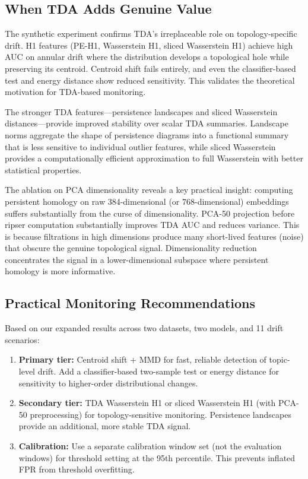 \subsection{When TDA Adds Genuine Value}

The synthetic experiment confirms TDA's irreplaceable role on topology-specific drift. H1 features (PE-H1, Wasserstein H1, sliced Wasserstein H1) achieve high AUC on annular drift where the distribution develops a topological hole while preserving its centroid. Centroid shift fails entirely, and even the classifier-based test and energy distance show reduced sensitivity. This validates the theoretical motivation for TDA-based monitoring.

The stronger TDA features---persistence landscapes and sliced Wasserstein distances---provide improved stability over scalar TDA summaries. Landscape norms aggregate the shape of persistence diagrams into a functional summary that is less sensitive to individual outlier features, while sliced Wasserstein provides a computationally efficient approximation to full Wasserstein with better statistical properties.

The ablation on PCA dimensionality reveals a key practical insight: computing persistent homology on raw 384-dimensional (or 768-dimensional) embeddings suffers substantially from the curse of dimensionality. PCA-50 projection before ripser computation substantially improves TDA AUC and reduces variance. This is because \vrfilt filtrations in high dimensions produce many short-lived features (noise) that obscure the genuine topological signal. Dimensionality reduction concentrates the signal in a lower-dimensional subspace where persistent homology is more informative.

\subsection{Practical Monitoring Recommendations}

Based on our expanded results across two datasets, two models, and 11 drift scenarios:

\begin{enumerate}[leftmargin=*,itemsep=2pt,topsep=2pt]
    \item \textbf{Primary tier:} Centroid shift + MMD for fast, reliable detection of topic-level drift. Add a classifier-based two-sample test or energy distance for sensitivity to higher-order distributional changes.
    \item \textbf{Secondary tier:} TDA Wasserstein H1 or sliced Wasserstein H1 (with PCA-50 preprocessing) for topology-sensitive monitoring. Persistence landscapes provide an additional, more stable TDA signal.
    \item \textbf{Calibration:} Use a separate calibration window set (not the evaluation windows) for threshold setting at the 95th percentile. This prevents inflated FPR from threshold overfitting.
\end{enumerate}

